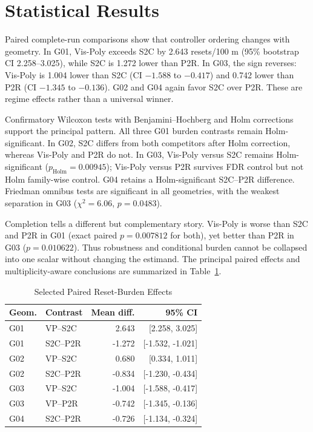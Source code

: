 \section{Statistical Results}
Paired complete-run comparisons show that controller ordering changes with geometry. In G01, Vis-Poly exceeds S2C by 2.643 resets/100 m (95\% bootstrap CI 2.258--3.025), while S2C is 1.272 lower than P2R. In G03, the sign reverses: Vis-Poly is 1.004 lower than S2C (CI $-1.588$ to $-0.417$) and 0.742 lower than P2R (CI $-1.345$ to $-0.136$). G02 and G04 again favor S2C over P2R. These are regime effects rather than a universal winner.

Confirmatory Wilcoxon tests with Benjamini--Hochberg and Holm corrections support the principal pattern. All three G01 burden contrasts remain Holm-significant. In G02, S2C differs from both competitors after Holm correction, whereas Vis-Poly and P2R do not. In G03, Vis-Poly versus S2C remains Holm-significant ($p_{\mathrm{Holm}}=0.00945$); Vis-Poly versus P2R survives FDR control but not Holm family-wise control. G04 retains a Holm-significant S2C--P2R difference. Friedman omnibus tests are significant in all geometries, with the weakest separation in G03 ($\chi^2=6.06$, $p=0.0483$).

Completion tells a different but complementary story. Vis-Poly is worse than S2C and P2R in G01 (exact paired $p=0.007812$ for both), yet better than P2R in G03 ($p=0.010622$). Thus robustness and conditional burden cannot be collapsed into one scalar without changing the estimand. The principal paired effects and multiplicity-aware conclusions are summarized in Table~\ref{tab:paired}.

\begin{table}[H]
\caption{Selected Paired Reset-Burden Effects}
\label{tab:paired}
\centering
\scriptsize
\begin{tabular}{llrr}
\toprule
Geom. & Contrast & Mean diff. & 95\% CI\\
\midrule
G01 & VP--S2C & 2.643 & [2.258, 3.025]\\
G01 & S2C--P2R & -1.272 & [-1.532, -1.021]\\
G02 & VP--S2C & 0.680 & [0.334, 1.011]\\
G02 & S2C--P2R & -0.834 & [-1.230, -0.434]\\
G03 & VP--S2C & -1.004 & [-1.588, -0.417]\\
G03 & VP--P2R & -0.742 & [-1.345, -0.136]\\
G04 & S2C--P2R & -0.726 & [-1.134, -0.324]\\
\bottomrule
\end{tabular}
\end{table}


